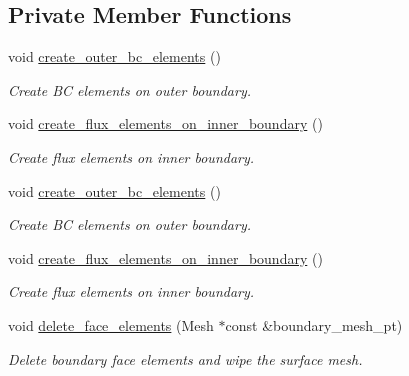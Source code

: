 \subsection*{Private Member Functions}
\begin{DoxyCompactItemize}
\item 
void \hyperlink{classFourierDecomposedHelmholtzProblem_a359d402bb4aed7d83973248d82085efb}{create\+\_\+outer\+\_\+bc\+\_\+elements} ()
\begin{DoxyCompactList}\small\item\em Create BC elements on outer boundary. \end{DoxyCompactList}\item 
void \hyperlink{classFourierDecomposedHelmholtzProblem_a81d64611f2de2492cec6b0621d8124b0}{create\+\_\+flux\+\_\+elements\+\_\+on\+\_\+inner\+\_\+boundary} ()
\begin{DoxyCompactList}\small\item\em Create flux elements on inner boundary. \end{DoxyCompactList}\item 
void \hyperlink{classFourierDecomposedHelmholtzProblem_a359d402bb4aed7d83973248d82085efb}{create\+\_\+outer\+\_\+bc\+\_\+elements} ()
\begin{DoxyCompactList}\small\item\em Create BC elements on outer boundary. \end{DoxyCompactList}\item 
void \hyperlink{classFourierDecomposedHelmholtzProblem_a81d64611f2de2492cec6b0621d8124b0}{create\+\_\+flux\+\_\+elements\+\_\+on\+\_\+inner\+\_\+boundary} ()
\begin{DoxyCompactList}\small\item\em Create flux elements on inner boundary. \end{DoxyCompactList}\item 
void \hyperlink{classFourierDecomposedHelmholtzProblem_aa2c19a495d042fbeca1e226e2ff73080}{delete\+\_\+face\+\_\+elements} (Mesh $\ast$const \&boundary\+\_\+mesh\+\_\+pt)
\begin{DoxyCompactList}\small\item\em Delete boundary face elements and wipe the surface mesh. \end{DoxyCompactList}\end{DoxyCompactItemize}
